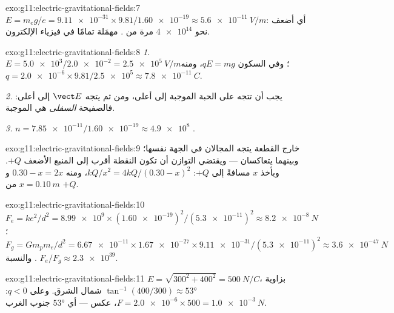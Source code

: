 \begin{solution}{exo:g11:electric-gravitational-fields:7}
$E = m_e g / e = \num{9.11e-31} \times 9.81 / \num{1.60e-19}
\approx \qty{5.6e-11}{V/m}$: أي أضعف نحو $\num{4e14}$ مرة من
 .  مهمَلة تمامًا في فيزياء الإلكترون.
\end{solution}

\begin{solution}{exo:g11:electric-gravitational-fields:8}
\emph{1.} $E = \num{5.0e3} / \num{2.0e-2} = \qty{2.5e5}{V/m}$؛ وفي السكون
$qE = mg$، ومنه
$q = \num{2.0e-6} \times 9.81 / \num{2.5e5} \approx \qty{7.8e-11}{C}$.

\emph{2.} يجب أن تتجه  على الحبة الموجبة إلى أعلى، ومن ثم يتجه $\vect E$
إلى أعلى: فالصفيحة \emph{السفلى} هي الموجبة.

\emph{3.} $n = \num{7.85e-11} / \num{1.60e-19} \approx \num{4.9e8}$
.
\end{solution}

\begin{solution}{exo:g11:electric-gravitational-fields:9}
خارج القطعة يتجه المجالان في الجهة نفسها؛ وبينهما يتعاكسان
--- ويقتضي التوازن أن تكون النقطة أقرب إلى المنبع الأضعف $+Q$.
وبأخذ $x$ مسافةً إلى $+Q$: $kQ/x^2 = 4kQ/(0.30 - x)^2$، ومنه
$0.30 - x = 2x$ و$x = \qty{0.10}{m}$ من $+Q$.
\end{solution}

\begin{solution}{exo:g11:electric-gravitational-fields:10}
$F_e = ke^2/d^2 = \num{8.99e9} \times (\num{1.60e-19})^2 /
(\num{5.3e-11})^2 \approx \qty{8.2e-8}{N}$؛
$F_g = G m_p m_e / d^2 = \num{6.67e-11} \times \num{1.67e-27} \times
\num{9.11e-31} / (\num{5.3e-11})^2 \approx \qty{3.6e-47}{N}$. والنسبة
$F_e / F_g \approx \num{2.3e39}$.
\end{solution}

\begin{solution}{exo:g11:electric-gravitational-fields:11}
$E = \sqrt{300^2 + 400^2} = \qty{500}{N/C}$، بزاوية
$\tan^{-1}(400/300) \approx \ang{53}$ شمال الشرق. وعلى $q < 0$:
$F = \num{2.0e-6} \times 500 = \qty{1.0e-3}{N}$، عكس  ---
أي $\ang{53}$ جنوب الغرب.
\end{solution}

